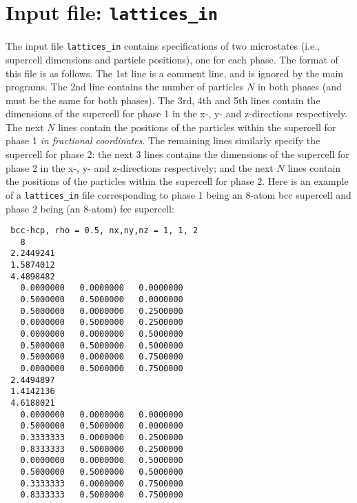 \documentclass{report}
\begin{document}
\section{Input file: \texttt{lattices\_in}}
The input file \texttt{lattices\_in} contains specifications of two microstates (i.e., supercell dimensions and particle positions), one for
each phase. The format of this file is as follows. The 1st line is a comment line, and is ignored by the main programs. The 2nd line contains
the number of particles $N$ in both phases (and must be the same for both phases). The 3rd, 4th and 5th lines contain the dimensions of the
supercell for phase 1 in the x-, y- and z-directions respectively. The next $N$ lines contain the positions of the particles within the supercell
for phase 1 \emph{in fractional coordinates}. The remaining lines similarly specify the supercell for phase 2: the next 3 lines contains the 
dimensions of the supercell for phase 2 in the x-, y- and z-directions respectively; and the next $N$ lines contain the positions of the 
particles within the supercell for phase 2. Here is an example of a \texttt{lattices\_in} file corresponding to phase 1 being an 8-atom bcc
supercell and phase 2 being (an 8-atom) fcc supercell:
\begin{verbatim}
 bcc-hcp, rho = 0.5, nx,ny,nz = 1, 1, 2
   8
 2.2449241     
 1.5874012     
 4.4898482
   0.0000000   0.0000000   0.0000000     
   0.5000000   0.5000000   0.0000000
   0.5000000   0.0000000   0.2500000
   0.0000000   0.5000000   0.2500000
   0.0000000   0.0000000   0.5000000
   0.5000000   0.5000000   0.5000000
   0.5000000   0.0000000   0.7500000
   0.0000000   0.5000000   0.7500000
 2.4494897     
 1.4142136     
 4.6188021     
   0.0000000   0.0000000   0.0000000
   0.5000000   0.5000000   0.0000000
   0.3333333   0.0000000   0.2500000
   0.8333333   0.5000000   0.2500000
   0.0000000   0.0000000   0.5000000
   0.5000000   0.5000000   0.5000000
   0.3333333   0.0000000   0.7500000
   0.8333333   0.5000000   0.7500000
\end{verbatim}
\end{document}

